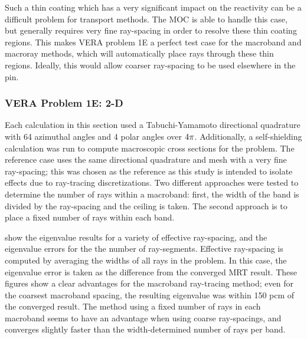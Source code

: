 {{{      Such a thin coating which has a very significant impact on the reactivity can be a difficult problem for transport methods.
      The \ac{MOC} is able to handle this case, but generally requires very fine ray-spacing in order to resolve these thin coating regions.
      This makes \ac{VERA} problem 1E a perfect test case for the macroband and macroray methods, which will automatically place rays through these thin regions.
      Ideally, this would allow coarser ray-spacing to be used elsewhere in the pin.

      \subsubsection{VERA Problem 1E: 2-D}{\label{sssec:MR:1E:2-D}
        Each calculation in this section used a Tabuchi-Yamamoto \cite{TabuchiYamamotoQuad} directional quadrature with 64 azimuthal angles and 4 polar angles over $4\pi$.
        Additionally, a self-shielding calculation was run to compute macroscopic cross sections for the problem.
        The reference case uses the same directional quadrature and mesh with a very fine ray-spacing; this was chosen as the reference as this study is intended to isolate effects due to ray-tracing discretizations.
        Two different approaches were tested to determine the number of rays within a macroband: first, the width of the band is divided by the ray-spacing and the ceiling is taken.
        The second approach is to place a fixed number of rays within each band.

         show the eigenvalue results for a variety of effective ray-spacing, and the eigenvalue errors for the the number of ray-segments.
        Effective ray-spacing is computed by averaging the widths of all rays in the problem.
        In this case, the eigenvalue error is taken as the difference from the converged \ac{MRT} result.
        These figures show a clear advantages for the macroband ray-tracing method;
          even for the coarsest macroband spacing, the resulting eigenvalue was within 150 pcm of the converged result.
        The method using a fixed number of rays in each macroband seems to have an advantage when using coarse ray-spacings, and converges slightly faster than the width-determined number of rays per band.

}}}}
